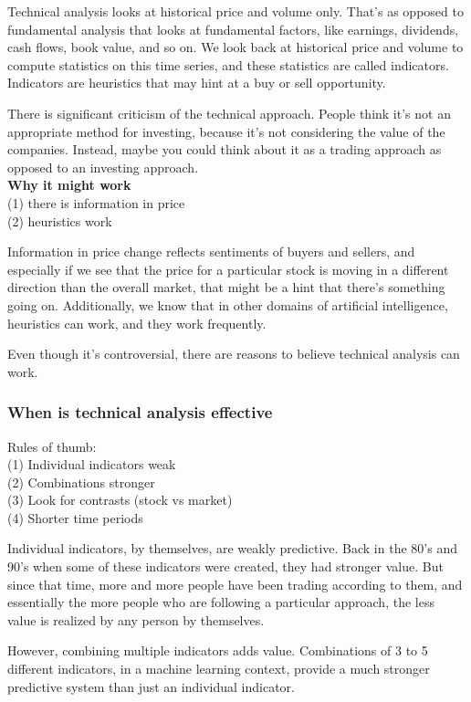 \documentclass[12pt]{article}
\begin{document}
Technical analysis looks at historical price and volume only. That's as opposed to fundamental analysis that looks at fundamental factors, like earnings, dividends, cash flows, book value, and so on. We look back at historical price and volume to compute statistics on this time series, and these statistics are called indicators. Indicators are heuristics that may hint at a buy or sell opportunity. 

There is significant criticism of the technical approach. People think it's not an appropriate method for investing, because it's not considering the value of the companies. Instead, maybe you could think about it as a trading approach as opposed to an investing approach. \\[8pt]
\noindent
\textbf{Why it might work} \\
(1) there is information in price \\
(2) heuristics work 

Information in price change reflects sentiments of buyers and sellers, and especially if we see that the price for a particular stock is moving in a different direction than the overall market, that might be a hint that there's something going on. Additionally, we know that in other domains of artificial intelligence, heuristics can work, and they work frequently. 

Even though it's controversial, there are reasons to believe technical analysis can work. 

\subsubsection{When is technical analysis effective}

Rules of thumb: \\
(1) Individual indicators weak \\
(2) Combinations stronger \\
(3) Look for contrasts (stock vs market) \\
(4) Shorter time periods

Individual indicators, by themselves, are weakly predictive. Back in the 80's and 90's when some of these indicators were created, they had stronger value. But since that time, more and more people have been trading according to them, and essentially the more people who are following a particular approach, the less value is realized by any person by themselves. 

However, combining multiple indicators adds value. Combinations of 3 to 5 different indicators, in a machine learning context, provide a much stronger predictive system than just an individual indicator. 
\end{document}
